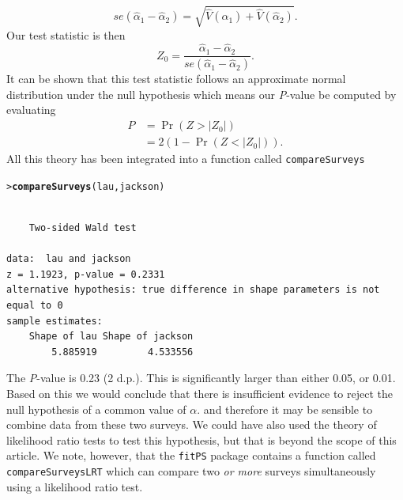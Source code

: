 \documentclass{article}\usepackage[]{graphicx}\usepackage[]{xcolor}
\makeatletter
\newcommand{\hldef}[1]{\textcolor[rgb]{0.345,0.345,0.345}{#1}}%
\newcommand{\hlkwd}[1]{\textcolor[rgb]{0.737,0.353,0.396}{\textbf{#1}}}%
\newenvironment{kframe}{%
 \def\at@end@of@kframe{}%
 \ifinner\ifhmode%
  \def\at@end@of@kframe{\end{minipage}}%
  \begin{minipage}{\columnwidth}%
 \fi\fi%
 \def\FrameCommand##1{\hskip\@totalleftmargin \hskip-\fboxsep
 \colorbox{shadecolor}{##1}\hskip-\fboxsep
     \hskip-\linewidth \hskip-\@totalleftmargin \hskip\columnwidth}%
 \MakeFramed {\advance\hsize-\width
   \@totalleftmargin\z@ \linewidth\hsize
   \@setminipage}}%
 {\par\unskip\endMakeFramed%
 \at@end@of@kframe}
\newenvironment{knitrout}{}{} %
\newcommand{\rcode}[1]{\lstinline[language=R,basicstyle=\normalsize\ttfamily]!#1!}
\makeatother
\begin{document}
\[
se(\hat{\alpha}_{1}-\hat{\alpha}_{2}) = \sqrt{\hat{V}(\hat{\alpha}_1)+\hat{V}(\hat{\alpha}_2)}.
\]
Our test statistic is then
\[
Z_0 = \frac{\hat{\alpha}_{1}-\hat{\alpha}_{2}}{se(\hat{\alpha}_{1}-\hat{\alpha}_{2})}.
\]
It can be shown that this test statistic follows an approximate normal distribution under the null hypothesis which means our \emph{P}-value be computed by evaluating
\begin{align*}
P&=\Pr(Z > |Z_0|) \\
&=2(1 - \Pr(Z < |Z_0|)).
\end{align*}
All this theory has been integrated into a function called \rcode{compareSurveys}
\begin{knitrout}
\color{fgcolor}\begin{kframe}
\begin{alltt}
\hldef{> }\hlkwd{compareSurveys}\hldef{(lau, jackson)}
\end{alltt}
\begin{verbatim}

	Two-sided Wald test

data:  lau and jackson
z = 1.1923, p-value = 0.2331
alternative hypothesis: true difference in shape parameters is not equal to 0
sample estimates:
    Shape of lau Shape of jackson 
        5.885919         4.533556 
\end{verbatim}
\end{kframe}
\end{knitrout}\noindent
The \emph{P}-value is 0.23 (2 d.p.). This is significantly larger than either 0.05, or 0.01. Based on this we would conclude that there is insufficient evidence to reject the null hypothesis of a common value of $\alpha$. and therefore it may be sensible to combine data from these two surveys. We could have also used the theory of likelihood ratio tests \citep{wiki:lrt} to test this hypothesis, but that is beyond the scope of this article. We note, however, that the \rcode{fitPS} package contains a function called \rcode{compareSurveysLRT} which can compare two \emph{or more} surveys simultaneously using a likelihood ratio test.
\end{document}
